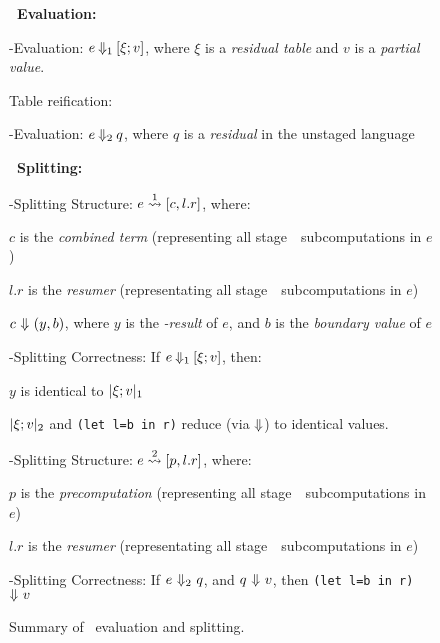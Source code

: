 \begin{figure*}

\textbf{\lang\ Evaluation:}

\hspace{2em}\bbone-Evaluation: $e\mathbin{{\Downarrow_{ 1}}}[\xi;v]$, where $\xi$ is a \emph{residual table} and $v$ is a \emph{partial value}. 

\hspace{2em}Table reification: 

\hspace{2em}\bbtwo-Evaluation: $e\mathbin{{\Downarrow_{ 2}}}q$, where $q$ is a \emph{residual} in the unstaged language \langTwo




\vspace{.75em}
\textbf{\lang\ Splitting:}

\hspace{2em}\bbone-Splitting Structure: $e \overset{ 1}\rightsquigarrow [c,l.r]$, where:

\hspace{4em}$c$ is the \emph{combined term} (representing all stage~\bbone\ subcomputations in $e$)

\hspace{4em}$l.r$ is the \emph{resumer} (representating all stage~\bbtwo\ subcomputations in $e$)

\hspace{4em}$c~{\Downarrow}~(y,b)$, where $y$ is the \emph{\bbone-result} of $e$, and $b$ is the \emph{boundary value} of $e$

 
\hspace{2em}\bbone-Splitting Correctness: If $e\mathbin{{\Downarrow_{ 1}}}[\xi;v]$, then:

\hspace{4em}$y$ is identical to $|\xi;v|_{ 1}$

\hspace{4em}$|\xi;v|_{ 2}$ and \texttt{(let l=b in r)} reduce (via ${\Downarrow}$) to identical values.  

\hspace{2em}\bbtwo-Splitting Structure: $e \overset{ 2}\rightsquigarrow [p,l.r]$, where:

\hspace{4em}$p$ is the \emph{precomputation} (representing all stage~\bbone\ subcomputations in $e$)

\hspace{4em}$l.r$ is the \emph{resumer} (representating all stage~\bbtwo\ subcomputations in $e$)

\hspace{2em}\bbtwo-Splitting Correctness: If $e~{\Downarrow_{ 2}}~q$, and $q~{\Downarrow}~v$, then \texttt{(let l=b in r)}~${\Downarrow}~v$


\caption{Summary of \lang\ evaluation and splitting.}
\label{fig:terminology}
\label{fig:termSplitSummary}
\end{figure*}

